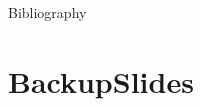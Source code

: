 \documentclass[17pt, t, lualatex]{beamer}
\begin{document}
\AtNextBibliography{\small}
\begin{frame}[allowframebreaks]{Bibliography}
	\printbibliography
\end{frame}












\section*{BackupSlides}\insertsectionpage
\end{document}
